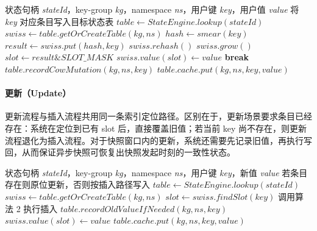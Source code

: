 \documentclass[a4paper,11pt]{article}
\begin{document}
\begin{algorithm}[!htbp]
\caption{状态插入算法（SwissTable 优先，L0 cache 写穿透）}
\footnotesize
\begin{algorithmic}[1]
\Require 状态句柄 \textit{stateId}，key-group \textit{kg}，namespace \textit{ns}，用户键 \textit{key}，用户值 \textit{value}
\Ensure 将 \textit{key} 对应条目写入目标状态表
\State $table \gets StateEngine.lookup(stateId)$
\State $swiss \gets table.getOrCreateTable(kg, ns)$
\State $hash \gets smear(key)$
  \State $result \gets swiss.put(hash, key)$
    \State $swiss.rehash()$
    \State $swiss.grow()$
  \Else
    \State $slot \gets result \mathbin{\&} SLOT\_MASK$
    \State $swiss.value(slot) \gets value$
    \State \textbf{break}
  \EndIf
\EndWhile
{}
  \State $table.recordCowMutation(kg, ns, key)$
\EndIf
{}  
  \State $table.cache.put(kg, ns, key, value)$
\EndIf
\end{algorithmic}
\end{algorithm}

\paragraph{更新（Update）}

更新流程与插入流程共用同一条索引定位路径。区别在于，更新场景要求条目已经存在：系统在定位到已有 slot 后，直接覆盖旧值；若当前 key 尚不存在，则更新流程退化为插入流程。对于快照窗口内的更新，系统还需要先记录旧值，再执行写回，从而保证异步快照可恢复出快照发起时刻的一致性状态。

\begin{algorithm}[!htbp]
\caption{状态更新算法（L0 cache 写穿透）}
\footnotesize
\begin{algorithmic}[1]
\Require 状态句柄 \textit{stateId}，key-group \textit{kg}，namespace \textit{ns}，用户键 \textit{key}，新值 \textit{value}
\Ensure 若条目存在则原位更新，否则按插入路径写入
\State $table \gets StateEngine.lookup(stateId)$
\State $swiss \gets table.getOrCreateTable(kg, ns)$
\State $slot \gets swiss.findSlot(key)$
  \State 调用算法 2 执行插入
  \State \Return
\EndIf
{}
  \State $table.recordOldValueIfNeeded(kg, ns, key)$
\EndIf
\State $swiss.value(slot) \gets value$
  \State $table.cache.put(kg, ns, key, value)$ 
\EndIf
\end{algorithmic}
\end{algorithm}
\end{document}
